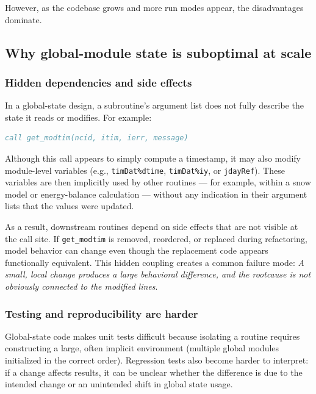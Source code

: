 \documentclass[11pt]{scrartcl}
\begin{document}
However, as the codebase grows and more run modes appear, the disadvantages dominate.

\subsection{Why global-module state is suboptimal at scale}

\subsubsection{Hidden dependencies and side effects}

In a global-state design, a subroutine’s argument list does not fully describe the
state it reads or modifies. For example:

\begin{lstlisting}[language=Fortran]
call get_modtim(ncid, itim, ierr, message)
\end{lstlisting}

Although this call appears to simply compute a timestamp, it may also modify
module-level variables (e.g., \texttt{timDat\%dtime}, \texttt{timDat\%iy},
or \texttt{jdayRef}). These variables are then implicitly used by other
routines --- for example, within a snow model or energy-balance calculation ---
without any indication in their argument lists that the values were updated.

As a result, downstream routines depend on side effects that are not visible
at the call site. If \texttt{get\_modtim} is removed, reordered, or replaced
during refactoring, model behavior can change even though the replacement code
appears functionally equivalent. This hidden coupling creates a common failure
mode: \emph{A small, local change produces a large behavioral difference, and
the rootcause is not obviously connected to the modified lines}.

\subsubsection{Testing and reproducibility are harder}

Global-state code makes unit tests difficult because isolating a routine requires
constructing a large, often implicit environment (multiple global modules initialized
in the correct order). Regression tests also become harder to interpret: if a change
affects results, it can be unclear whether the difference is due to the intended change
or an unintended shift in global state usage.
\end{document}
